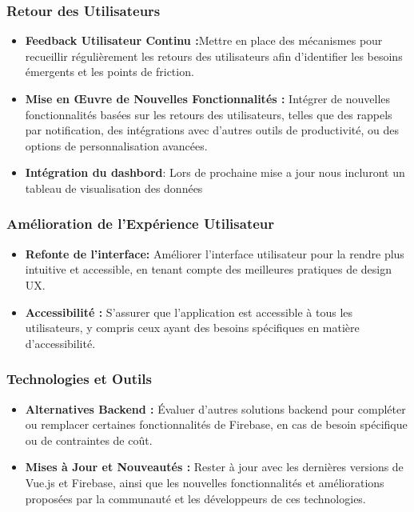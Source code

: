 \documentclass[a4paper,12pt]{report}
\begin{document}
    \subsubsection{Retour des Utilisateurs}
      \begin{itemize}
      \item\textbf{Feedback Utilisateur Continu :}Mettre en place des mécanismes pour recueillir régulièrement les retours des utilisateurs afin d'identifier les besoins émergents et les points de friction.
      \item\textbf{Mise en Œuvre de Nouvelles Fonctionnalités :} Intégrer de nouvelles fonctionnalités basées sur les retours des utilisateurs, telles que des rappels par notification, des intégrations avec d'autres outils de productivité, ou des options de personnalisation avancées.
      \item\textbf{Intégration du dashbord}: Lors de prochaine mise a jour nous incluront un tableau de visualisation des données
    \end{itemize}
    
    \subsubsection{Amélioration de l'Expérience Utilisateur}
    \begin{itemize}
      \item\textbf{Refonte de l'interface: }Améliorer l'interface utilisateur pour la rendre plus intuitive et accessible, en tenant compte des meilleures pratiques de design UX.
      \item\textbf{Accessibilité :} S'assurer que l'application est accessible à tous les utilisateurs, y compris ceux ayant des besoins spécifiques en matière d'accessibilité.
    \end{itemize}
    
      \subsubsection{Technologies et Outils}
    \begin{itemize}
      \item\textbf{Alternatives Backend :} Évaluer d'autres solutions backend pour compléter ou remplacer certaines fonctionnalités de Firebase, en cas de besoin spécifique ou de contraintes de coût.
      \item\textbf{Mises à Jour et Nouveautés :} Rester à jour avec les dernières versions de Vue.js et Firebase, ainsi que les nouvelles fonctionnalités et améliorations proposées par la communauté et les développeurs de ces technologies.
    \end{itemize}
    
\end{document}
